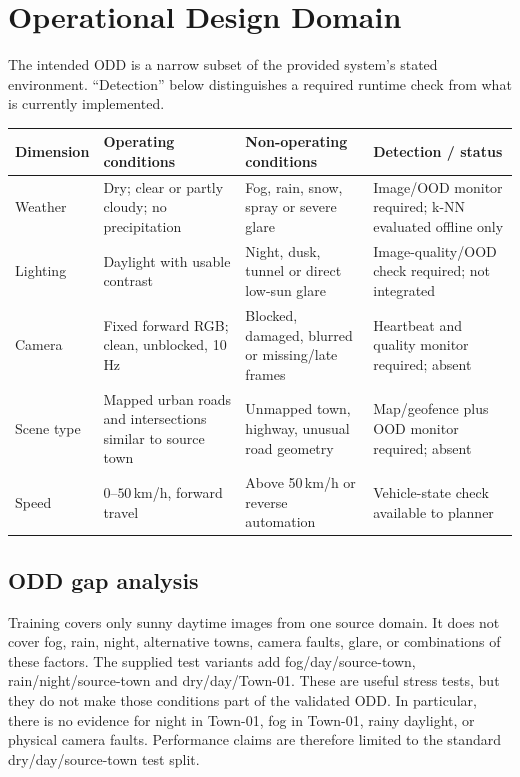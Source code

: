 \documentclass[nologo,a4paper,12pt]{article}
\begin{document}
\clearpage
\section{Operational Design Domain}
\label{sec:odd}

The intended ODD is a narrow subset of the provided system's stated environment. ``Detection''
below distinguishes a required runtime check from what is currently implemented.

{\footnotesize
\begin{tabularx}{\linewidth}{@{}p{1.8cm}YYY@{}}
\toprule
\textbf{Dimension} & \textbf{Operating conditions} & \textbf{Non-operating conditions} & \textbf{Detection / status} \\
\midrule
Weather & Dry; clear or partly cloudy; no precipitation & Fog, rain, snow, spray or severe glare & Image/OOD monitor required; k-NN evaluated offline only \\
Lighting & Daylight with usable contrast & Night, dusk, tunnel or direct low-sun glare & Image-quality/OOD check required; not integrated \\
Camera & Fixed forward RGB; clean, unblocked, 10\,Hz & Blocked, damaged, blurred or missing/late frames & Heartbeat and quality monitor required; absent \\
Scene type & Mapped urban roads and intersections similar to source town & Unmapped town, highway, unusual road geometry & Map/geofence plus OOD monitor required; absent \\
Speed & $0$--$50$\,km/h, forward travel & Above 50\,km/h or reverse automation & Vehicle-state check available to planner \\
\bottomrule
\end{tabularx}}

\subsection{ODD gap analysis}

Training covers only sunny daytime images from one source domain. It does not cover fog, rain,
night, alternative towns, camera faults, glare, or combinations of these factors. The supplied
test variants add fog/day/source-town, rain/night/source-town and dry/day/Town-01. These are useful
stress tests, but they do not make those conditions part of the validated ODD. In particular,
there is no evidence for night in Town-01, fog in Town-01, rainy daylight, or physical camera
faults. Performance claims are therefore limited to the standard dry/day/source-town test split.
\end{document}
